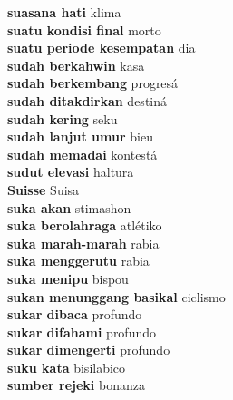 \textbf{ suasana hati  } klima \\
\textbf{ suatu kondisi final  } morto \\
\textbf{ suatu periode kesempatan  } dia \\
\textbf{ sudah berkahwin  } kasa \\
\textbf{ sudah berkembang  } progresá \\
\textbf{ sudah ditakdirkan  } destiná \\
\textbf{ sudah kering  } seku \\
\textbf{ sudah lanjut umur  } bieu \\
\textbf{ sudah memadai  } kontestá \\
\textbf{ sudut elevasi  } haltura \\
\textbf{ Suisse  } Suisa \\
\textbf{ suka akan  } stimashon \\
\textbf{ suka berolahraga  } atlétiko \\
\textbf{ suka marah-marah  } rabia \\
\textbf{ suka menggerutu  } rabia \\
\textbf{ suka menipu  } bispou \\
\textbf{ sukan menunggang basikal  } ciclismo \\
\textbf{ sukar dibaca  } profundo \\
\textbf{ sukar difahami  } profundo \\
\textbf{ sukar dimengerti  } profundo \\
\textbf{ suku kata  } bisilabico \\
\textbf{ sumber rejeki  } bonanza \\
